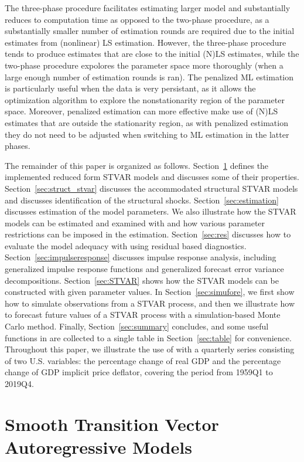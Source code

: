 \documentclass[nojss]{jss}
\begin{document}
The three-phase procedure facilitates estimating larger model and substantially reduces to computation time as opposed to the two-phase procedure, as a substantially smaller number of estimation rounds are required due to the initial estimates from (nonlinear) LS estimation. However, the three-phase procedure tends to produce estimates that are close to the initial (N)LS estimates, while the two-phase procedure expolores the parameter space more thoroughly (when a large enough number of estimation rounds is ran). The penalized ML estimation is particularly useful when the data is very persistant, as it allows the optimization algorithm to explore the nonstationarity region of the parameter space. Moreover, penalized estimation can more effective make use of (N)LS estimates that are outside the stationarity region, as with penalized estimation they do not need to be adjusted when switching to ML estimation in the latter phases.

The remainder of this paper is organized as follows. Section~\ref{sec:models} defines the implemented reduced form STVAR models and discusses some of their properties. Section~\ref{sec:struct_stvar} discusses the accommodated structural STVAR models and discusses identification of the structural shocks. Section~\ref{sec:estimation} discusses estimation of the model parameters. We also illustrate how the STVAR models can be estimated and examined with  and how various parameter restrictions can be imposed in the estimation. Section~\ref{sec:res} discusses how to evaluate the model adequacy with  using residual based diagnostics. Section~\ref{sec:impulseresponse} discusses impulse response analysis, including generalized impulse response functions and generalized forecast error variance decompositions. Section~\ref{sec:STVAR} shows how the STVAR models can be constructed with given parameter values. In Section~\ref{sec:simufore}, we first show how to simulate observations from a STVAR process, and then we illustrate how to forecast future values of a STVAR process with a simulation-based Monte Carlo method. Finally, Section~\ref{sec:summary} concludes, and some useful functions in  are collected to a single table in Section~\ref{sec:table} for convenience. Throughout this paper, we illustrate the use of  with a quarterly series consisting of two U.S. variables: the percentage change of real GDP and the percentage change of GDP implicit price deflator, covering the period from 1959Q1 to 2019Q4.


\section{Smooth Transition Vector Autoregressive Models}\label{sec:models}
\end{document}
